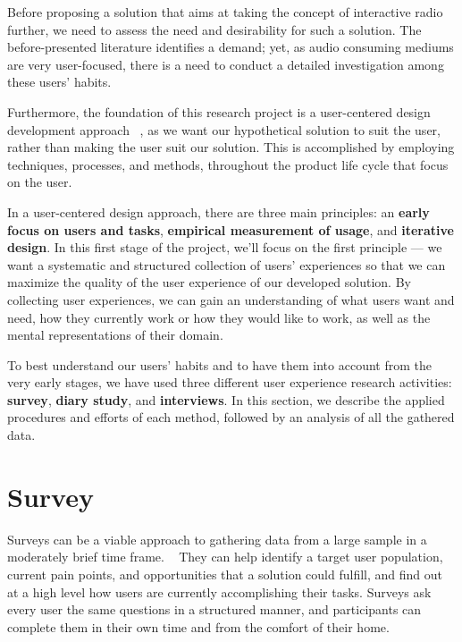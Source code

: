 \cleardoublepage
\label{chap:userresearch}

Before proposing a solution that aims at taking the concept of interactive radio further, we need to assess the need and desirability for such a solution. The before-presented literature identifies a demand; yet, as audio consuming mediums are very user-focused, there is a need to conduct a detailed investigation among these users' habits.

Furthermore, the foundation of this research project is a user-centered design development approach ~\cite{McLoone2010}, as we want our hypothetical solution to suit the user, rather than making the user suit our solution. This is accomplished by employing techniques, processes, and methods, throughout the product life cycle that focus on the user. ~\cite{Courage2005} 

In a user-centered design approach, there are three main principles: an \textbf{early focus on users and tasks}, \textbf{empirical measurement of usage}, and \textbf{iterative design}. In this first stage of the project, we'll focus on the first principle — we want a systematic and structured collection of users’ experiences so that we can maximize the quality of the user experience of our developed solution. By collecting user experiences, we can gain an understanding of what users want and need, how they currently work or how they would like to work, as well as the mental representations of their domain.

To best understand our users' habits and to have them into account from the very early stages, we have used three different user experience research activities: \textbf{survey}, \textbf{diary study}, and \textbf{interviews}. In this section, we describe the applied procedures and efforts of each method, followed by an analysis of all the gathered data.


\section{Survey}
Surveys can be a viable approach to gathering data from a large sample in a moderately brief time frame. ~\cite{Courage2005} They can help identify a target user population, current pain points, and opportunities that a solution could fulfill, and find out at a high level how users are currently accomplishing their tasks. Surveys ask every user the same questions in a structured manner, and participants can complete them in their own time and from the comfort of their home.

